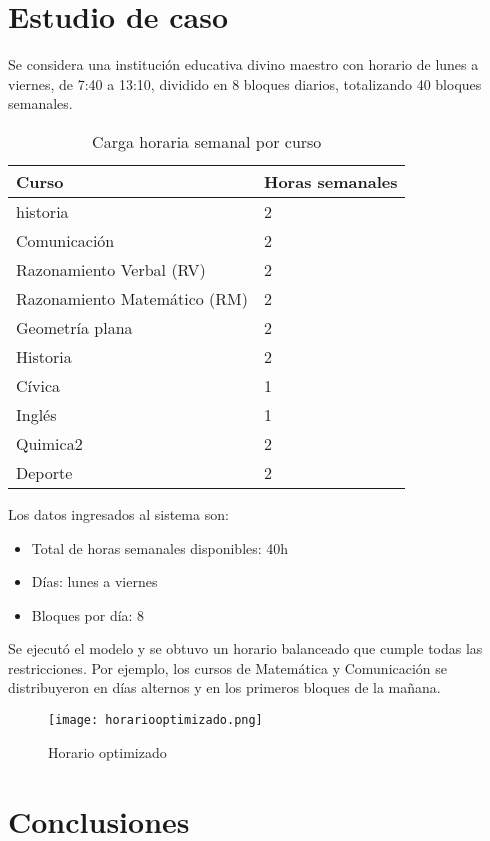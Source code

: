 \documentclass[12pt]{article}
\begin{document}
\section{Estudio de caso}

Se considera una institución educativa divino maestro con horario de lunes a viernes, de 7:40 a 13:10, dividido en 8 bloques diarios, totalizando 40 bloques semanales.

\begin{table}[H]
\centering
\caption{Carga horaria semanal por curso}
\begin{tabular}{@{}ll@{}}
\toprule
\textbf{Curso} & \textbf{Horas semanales} \\
\midrule
historia & 2 \\
Comunicación & 2 \\
Razonamiento Verbal (RV) & 2 \\
Razonamiento Matemático (RM) & 2 \\
Geometría plana & 2 \\
Historia & 2 \\
Cívica & 1 \\
Inglés & 1 \\
Quimica2 & 2 \\
Deporte & 2 \\
\bottomrule
\end{tabular}
\end{table}

Los datos ingresados al sistema son:
\begin{itemize}
    \item Total de horas semanales disponibles: 40h
    \item Días: lunes a viernes
    \item Bloques por día: 8
\end{itemize}

Se ejecutó el modelo y se obtuvo un horario balanceado que cumple todas las restricciones. Por ejemplo, los cursos de Matemática y Comunicación se distribuyeron en días alternos y en los primeros bloques de la mañana.

\begin{figure}[H] %
    \centering
    \texttt{[image: horariooptimizado.png]} %
    \caption{Horario optimizado}
    \label{fig:horario_optimizado}
\end{figure}

\section{Conclusiones}
\end{document}
